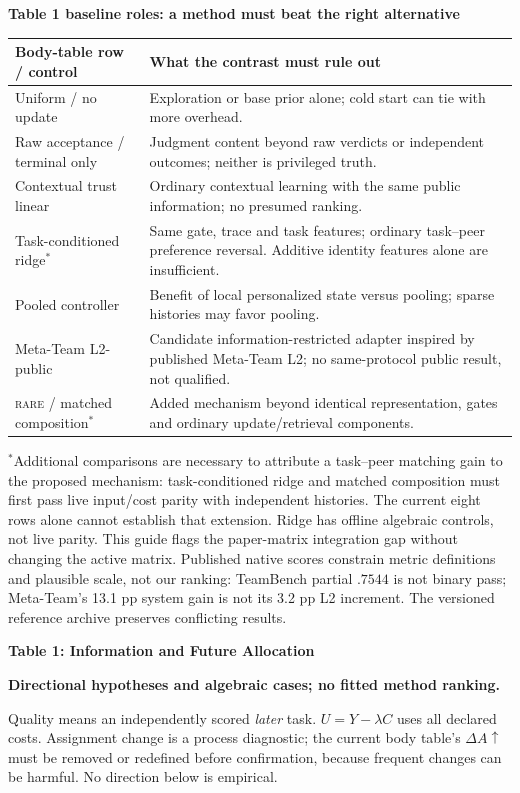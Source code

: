 \documentclass[10pt,a4paper]{article}
\newcommand{\lead}[1]{\vspace{4pt}\textbf{#1}\par}
\newcommand{\rare}{\textsc{rare}}
\newcommand{\caution}{\textcolor{red!70!black}{\textbf{Directional hypotheses and algebraic cases; no fitted method ranking.}}\par}
\begin{document}
\lead{Table 1 baseline roles: a method must beat the right alternative}
\begin{center}\small
\begin{tabularx}{\linewidth}{@{}L{.27\linewidth}X@{}}\toprule
Body-table row / control & What the contrast must rule out\\\midrule
Uniform / no update & Exploration or base prior alone; cold start can tie with more overhead.\\
Raw acceptance / terminal only & Judgment content beyond raw verdicts or independent outcomes; neither is privileged truth.\\
Contextual trust linear & Ordinary contextual learning with the same public information; no presumed ranking.\\
Task-conditioned ridge$^{*}$ & Same gate, trace and task features; ordinary task--peer preference reversal. Additive identity features alone are insufficient.\\
Pooled controller & Benefit of local personalized state versus pooling; sparse histories may favor pooling.\\
Meta-Team L2-public & Candidate information-restricted adapter inspired by published Meta-Team L2; no same-protocol public result, not qualified.\\
\rare{} / matched composition$^{*}$ & Added mechanism beyond identical representation, gates and ordinary update/retrieval components.\\\bottomrule
\end{tabularx}\end{center}
\footnotesize $^{*}$Additional comparisons are necessary to attribute a
task--peer matching gain to the proposed mechanism: task-conditioned ridge and
matched composition must first pass live input/cost parity with independent
histories. The current eight rows alone cannot establish that extension.
Ridge has offline algebraic controls, not live parity. This guide flags the
paper-matrix integration gap without changing the active matrix.
Published native scores constrain metric
definitions and plausible scale, not our ranking: TeamBench partial $.7544$ is
not binary pass; Meta-Team's 13.1 pp system gain is not its 3.2 pp L2 increment.
The versioned reference archive preserves conflicting results.\normalsize

\clearpage
{\large\bfseries Table 1: Information and Future Allocation}\par\caution
Quality means an independently scored \emph{later} task. $U=Y-\lambda C$ uses
all declared costs. Assignment change is a process diagnostic; the current body
table's $\Delta A\uparrow$ must be removed or redefined before confirmation,
because frequent changes can be harmful. No direction below is empirical.
\end{document}
